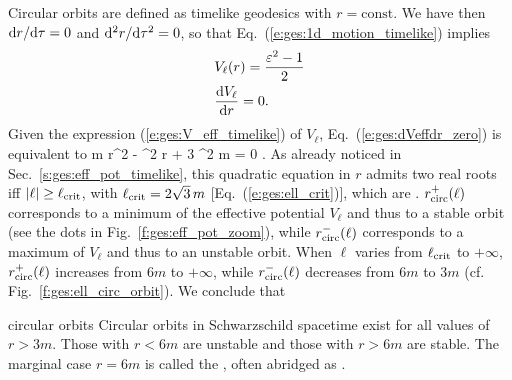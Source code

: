Circular orbits are defined as timelike geodesics with $r = \mathrm{const}$.
We have then $\mathrm{d} r/\mathrm{d}\tau = 0$ and $\mathrm{d}^2 r/\mathrm{d}\tau^2 = 0$, so that
Eq.~(\ref{e:ges:1d_motion_timelike}) implies
\begin{subequations}
\begin{align}
& V_{\ell}(r) = \frac{\varepsilon^2 - 1}{2} \label{e:ges:Veff_circ} \\
& \frac{\mathrm{d} V_{\ell}}{\mathrm{d} r} = 0 . \label{e:ges:dVeffdr_zero}
\end{align}
\end{subequations}
Given the expression (\ref{e:ges:V_eff_timelike}) of $V_{\ell}$,
Eq.~(\ref{e:ges:dVeffdr_zero}) is equivalent to
\be \label{e:ges:eq_r_ell_circ}
    m r^2 - \ell^2 r + 3 \ell^2 m = 0 .
\ee
As already noticed in Sec.~\ref{s:ges:eff_pot_timelike}, this
quadratic equation in $r$ admits two real roots iff $|\ell| \geq \ell_{\rm crit}$,
with $\ell_{\rm crit} = 2\sqrt{3}\, m$ [Eq.~(\ref{e:ges:ell_crit})],
which are
\be \label{e:ges:r_circ_ell}
    .
\ee
$r_{\rm circ}^+(\ell)$ corresponds to a minimum of the effective potential
$V_{\ell}$ and thus
to a stable orbit (see the dots in Fig.~\ref{f:ges:eff_pot_zoom}),
while $r_{\rm circ}^-(\ell)$ corresponds to a
maximum of $V_{\ell}$ and thus to an unstable orbit.
When $\ell$ varies from $\ell_{\rm crit}$ to $+\infty$,
$r_{\rm circ}^+(\ell)$ increases from $6 m$ to $+\infty$, while
$r_{\rm circ}^-(\ell)$ decreases from $6 m$ to $3 m$ (cf. Fig.~\ref{f:ges:ell_circ_orbit}). We conclude that
\begin{tprop}{circular orbits}{}
Circular orbits in Schwarzschild spacetime exist for all values of $r>3m$.
Those with $r<6m$ are unstable and those with $r>6m$ are stable. The marginal
case $r=6m$ is called the
, often abridged as .
\end{tprop}

